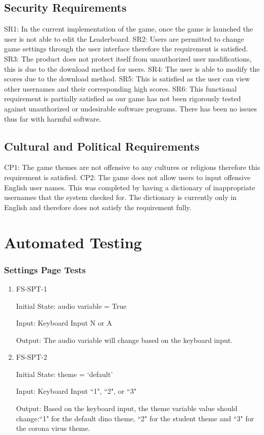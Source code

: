 \documentclass[12pt, titlepage]{article}
\begin{document}
\subsection{Security Requirements}	
SR1: In the current implementation of the game, once the game is launched the user is not able to edit the Leaderboard. 
SR2: Users are permitted to change game settings through the user interface therefore the requirement is satisfied. 
SR3: The product does not protect itself from unauthorized user modifications, this is due to the download method for users. 
SR4: The user is able to modify the scores due to the download method. 
SR5: This is satisfied as the user can view other usernames and their corresponding high scores. 
SR6: This functional requirement is partially satisfied as our game has not been rigorously tested against unauthorized or undesirable software programs. There has been no issues thus far with harmful software. 

\subsection{Cultural and Political Requirements}
CP1: The game themes are not offensive to any cultures or religions therefore this requirement is satisfied. 
CP2: The game does not allow users to input offensive English user names. This was completed by having a dictionary of inappropriate usernames that the system checked for. The dictionary is currently only in English and therefore does not satisfy the requirement fully. 


\section{Automated Testing}
\subsubsection{Settings Page Tests}
	
\begin{enumerate}

\item{FS-SPT-1\\}

Initial State: audio variable = True
					
Input: Keyboard Input N or A 
					
Output: The audio variable will change based on the keyboard input. 


\item{FS-SPT-2\\}


Initial State: theme = `default'
					
Input: Keyboard Input ``1", ``2", or ``3"
					
Output: Based on the keyboard input, the theme variable value should change:``1" for the default dino theme, ``2" for the student theme and ``3" for the corona virus theme.
				
\end{enumerate}
\end{document}
